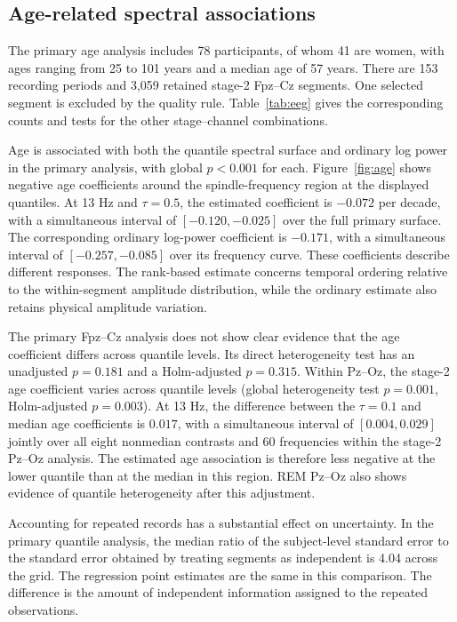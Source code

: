 \subsection{Age-related spectral associations}
The primary age analysis includes 78 participants, of whom 41 are women, with ages ranging from 25 to 101 years and a median age of 57 years. There are 153 recording periods and 3,059 retained stage-2 Fpz--Cz segments. One selected segment is excluded by the quality rule. Table~\ref{tab:eeg} gives the corresponding counts and tests for the other stage--channel combinations.

Age is associated with both the quantile spectral surface and ordinary log power in the primary analysis, with global $p<0.001$ for each. Figure~\ref{fig:age} shows negative age coefficients around the spindle-frequency region at the displayed quantiles. At 13 Hz and $\tau=0.5$, the estimated coefficient is $-0.072$ per decade, with a simultaneous interval of $[-0.120,-0.025]$ over the full primary surface. The corresponding ordinary log-power coefficient is $-0.171$, with a simultaneous interval of $[-0.257,-0.085]$ over its frequency curve. These coefficients describe different responses. The rank-based estimate concerns temporal ordering relative to the within-segment amplitude distribution, while the ordinary estimate also retains physical amplitude variation.

The primary Fpz--Cz analysis does not show clear evidence that the age coefficient differs across quantile levels. Its direct heterogeneity test has an unadjusted $p=0.181$ and a Holm-adjusted $p=0.315$. Within Pz--Oz, the stage-2 age coefficient varies across quantile levels (global heterogeneity test $p=0.001$, Holm-adjusted $p=0.003$). At 13 Hz, the difference between the $\tau=0.1$ and median age coefficients is $0.017$, with a simultaneous interval of $[0.004,0.029]$ jointly over all eight nonmedian contrasts and 60 frequencies within the stage-2 Pz--Oz analysis. The estimated age association is therefore less negative at the lower quantile than at the median in this region. REM Pz--Oz also shows evidence of quantile heterogeneity after this adjustment.

Accounting for repeated records has a substantial effect on uncertainty. In the primary quantile analysis, the median ratio of the subject-level standard error to the standard error obtained by treating segments as independent is 4.04 across the grid. The regression point estimates are the same in this comparison. The difference is the amount of independent information assigned to the repeated observations.

